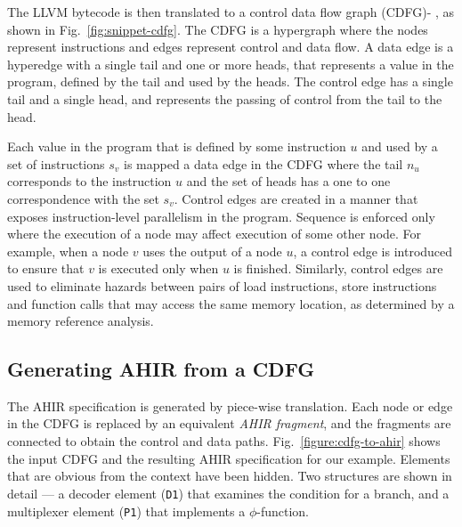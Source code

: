 \documentclass[conference]{IEEEtran}
\begin{document}
The LLVM bytecode is then translated to a control data flow graph
(CDFG)\cite{conditional_branches_rim_jain_1992}-%
\cite{functional_synthesis_TASS_amellal_kaminska_1994}, as shown in
Fig.~\ref{fig:snippet-cdfg}. The CDFG is a hypergraph where the nodes
represent instructions and edges represent control and data flow. A
data edge is a hyperedge with a single tail and one or more heads,
that represents a value in the program, defined by the tail and used
by the heads. The control edge has a single tail and a single head,
and represents the passing of control from the tail to the head.

Each value in the program that is defined by some instruction $u$ and
used by a set of instructions $s_v$ is mapped a data edge in the CDFG
where the tail $n_u$ corresponds to the instruction $u$ and the set of
heads has a one to one correspondence with the set $s_v$. Control
edges are created in a manner that exposes instruction-level
parallelism in the program. Sequence is enforced only where the
execution of a node may affect execution of some other node. For
example, when a node $v$ uses the output of a node $u$, a control edge
is introduced to ensure that $v$ is executed only when $u$ is
finished. Similarly, control edges are used to eliminate hazards
between pairs of load instructions, store instructions and function
calls that may access the same memory location, as determined by a
memory reference analysis.

\subsection{Generating AHIR from a CDFG}

\begin{figure*}
\centering
{}%
\hspace{0.25in}%
%
\hspace{0.25in}%
%
\caption{Translating a CDFG to AHIR.}%
\label{figure:cdfg-to-ahir}%
\end{figure*}

The AHIR specification is generated by piece-wise translation. Each
node or edge in the CDFG is replaced by an equivalent \emph{AHIR
  fragment}, and the fragments are connected to obtain the control and
data paths. Fig.~\ref{figure:cdfg-to-ahir} shows the input CDFG and
the resulting AHIR specification for our example. Elements that are
obvious from the context have been hidden. Two structures are shown in
detail --- a decoder element (\texttt{D1}) that examines the condition
for a branch, and a multiplexer element (\texttt{P1}) that implements
a $\phi$-function.
\end{document}
